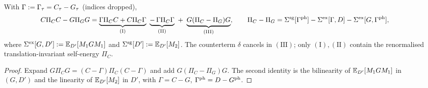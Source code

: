 \begin{lemma}[sandwich]\label{app:a04:lem:sandwich}
With $\Gamma:=\Gamma_\tau=C_\tau-G_\tau$ (indices dropped),
\begin{equation}\label{app:a04:eq:sandwich}
C\Pi_CC-G\Pi_GG=\underbrace{\Gamma\Pi_CC+C\Pi_C\Gamma}_{(\mathrm I)}\ \underbrace{-\,\Gamma\Pi_C\Gamma}_{(\mathrm{II})}\ +\ \underbrace{G(\Pi_C-\Pi_G)G}_{(\mathrm{III})},\qquad
\Pi_C-\Pi_G=\Sigma^{\mathrm{sg}}[\Gamma^\ph]-\Sigma^{\mathrm{ex}}[\Gamma,D]-\Sigma^{\mathrm{ex}}[G,\Gamma^\ph],
\end{equation}
where $\Sigma^{\mathrm{ex}}[G,D']:=\mathbb E_{D'}[M_1GM_1]$ and $\Sigma^{\mathrm{sg}}[D']:=\mathbb E_{D'}[M_2]$. The counterterm $\delta$ cancels in $(\mathrm{III})$; only $(\mathrm I),(\mathrm{II})$ contain the renormalised translation-invariant self-energy $\Pi_C$.
\end{lemma}
\begin{proof}
Expand $G\Pi_CG=(C-\Gamma)\Pi_C(C-\Gamma)$ and add $G(\Pi_C-\Pi_G)G$. The second identity is the bilinearity of $\mathbb E_{D'}[M_1GM_1]$ in $(G,D')$ and the linearity of $\mathbb E_{D'}[M_2]$ in $D'$, with $\Gamma=C-G$, $\Gamma^{\mathrm{ph}}=D-G^{\mathrm{ph}}$.
\end{proof}

